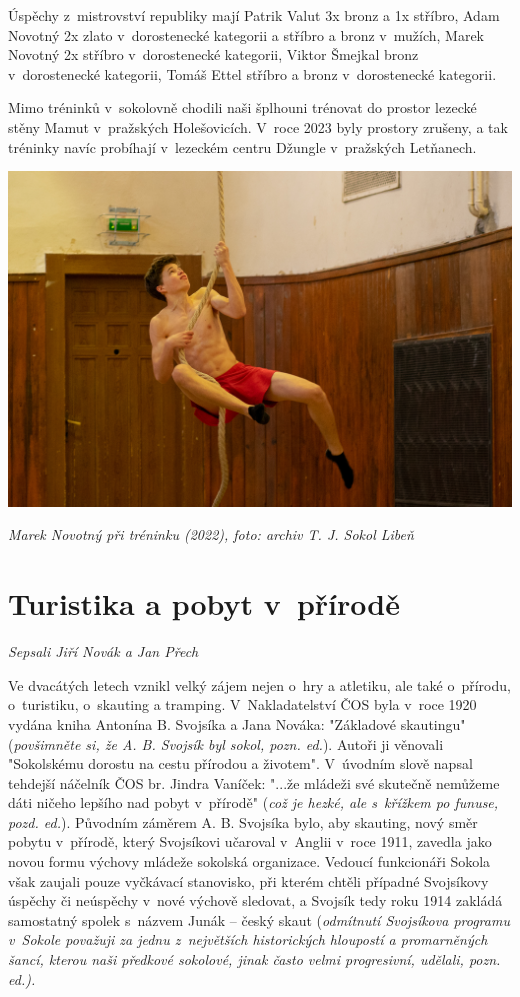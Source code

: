 \documentclass[a5paper, 11pt, twoside]{article}
\begin{document}
Úspěchy z~mistrovství republiky mají Patrik Valut 3x bronz a 1x stříbro,
Adam Novotný 2x zlato v~dorostenecké kategorii a stříbro a bronz
v~mužích, Marek Novotný 2x stříbro v~dorostenecké kategorii, Viktor
Šmejkal bronz v~dorostenecké kategorii, Tomáš Ettel stříbro a bronz
v~dorostenecké kategorii.

Mimo tréninků v~sokolovně chodili naši šplhouni trénovat do prostor
lezecké stěny Mamut v~pražských Holešovicích. V~roce 2023 byly prostory
zrušeny, a tak tréninky navíc probíhají v~lezeckém centru Džungle
v~pražských Letňanech.

 \includegraphics[width=\textwidth]{img/76_splh.jpg}

\textit{Marek Novotný při tréninku (2022), foto: archiv T. J. Sokol Libeň}

\section{Turistika a pobyt v~přírodě}

\textit{Sepsali Jiří Novák a Jan Přech}

Ve dvacátých letech vznikl velký zájem nejen o~hry a atletiku, ale také
o~přírodu, o~turistiku, o~skauting a tramping. V~Nakladatelství ČOS byla
v~roce 1920 vydána kniha Antonína B. Svojsíka a Jana Nováka: "Základové
skautingu" (\textit{povšimněte si, že A. B. Svojsík byl sokol, pozn.
ed.}). Autoři ji věnovali "Sokolskému dorostu na cestu přírodou a
životem". V~úvodním slově napsal tehdejší náčelník ČOS br. Jindra
Vaníček: "...že mládeži své skutečně nemůžeme dáti ničeho lepšího nad
pobyt v~přírodě" (\textit{což je hezké, ale s~křížkem po funuse, pozd.
ed.}). Původním záměrem A. B. Svojsíka bylo, aby skauting, nový směr
pobytu v~přírodě, který Svojsíkovi učaroval v~Anglii v~roce 1911,
zavedla jako novou formu výchovy mládeže sokolská organizace. Vedoucí
funkcionáři Sokola však zaujali pouze vyčkávací stanovisko, při kterém
chtěli případné Svojsíkovy úspěchy či neúspěchy v~nové výchově sledovat,
a Svojsík tedy roku 1914 zakládá samostatný spolek s~názvem Junák --
český skaut (\textit{odmítnutí Svojsíkova programu v~Sokole považuji za
jednu z~největších historických hloupostí a promarněných šancí, kterou
naši předkové sokolové, jinak často velmi progresivní, udělali, pozn.
ed.).}
\end{document}
